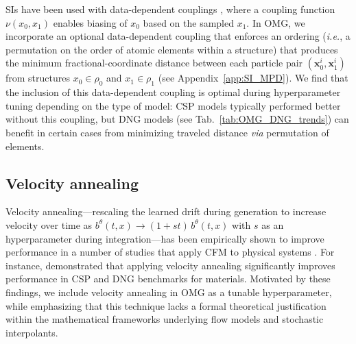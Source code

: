 SIs have been used with data-dependent couplings \citep{albergo_stochastic_2024}, where a coupling function $\nu(x_0, x_1)$ enables  biasing of $x_0$ based on the sampled $x_1$.
In OMG, we incorporate an optional data-dependent coupling that enforces an ordering (\textit{i.e.}, a permutation on the order of atomic elements within a structure) that produces the minimum fractional-coordinate distance between each particle pair $(\bm{x}_0^i, \bm{x}_1^i)$ from structures $x_0 \in \rho_0$ and $x_1 \in \rho_1$ (see Appendix~\ref{app:SI_MPD}). We find that the inclusion of this data-dependent coupling is optimal during hyperparameter tuning depending on the type of model: CSP models typically performed better without this coupling, but DNG models (see Tab.~\ref{tab:OMG_DNG_trends}) can benefit in certain cases from minimizing traveled distance \textit{via} permutation of elements.

\subsection{Velocity annealing}

Velocity annealing---rescaling the learned drift during generation to increase velocity over time as $b^\theta(t,x) \rightarrow (1+st)\,b^\theta(t,x)$ with $s$ as an hyperparameter during integration---has been empirically shown to improve performance in a number of studies that apply CFM to physical systems \citep{yim_fast_2023, bose_se3stochastic_2024, miller_flowmm_2024}.
For instance, \citet{miller_flowmm_2024} demonstrated that applying velocity annealing significantly improves performance in CSP and DNG benchmarks for materials. Motivated by these findings, we include velocity annealing in OMG as a tunable hyperparameter, while emphasizing that this technique lacks a formal theoretical justification within the mathematical frameworks underlying flow models and stochastic interpolants.